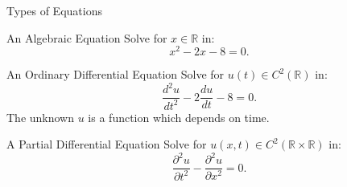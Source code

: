 \documentclass[10pt]{beamer}
\begin{document}

\begin{frame}{Types of Equations}

\begin{block}{An Algebraic Equation}
Solve for \( x \in \mathbb{R} \) in:  
\[
x^2 - 2x - 8 = 0.
\]
\end{block}

\begin{block}{An Ordinary Differential Equation}
Solve for \( u(t) \in C^2(\mathbb{R}) \) in:  
\[
\frac{d^2 u}{dt^2} - 2\frac{du}{dt} - 8 = 0.
\]
The unknown $u$ is a function which depends on time.
\end{block}

\begin{block}{A Partial Differential Equation}
Solve for \( u(x, t) \in C^2(\mathbb{R} \times \mathbb{R})  \) in:  
\[
\frac{\partial^2 u}{\partial t^2} - \frac{\partial^2 u}{\partial x^2} = 0.
\]
\end{block}

\end{frame}
\end{document}
